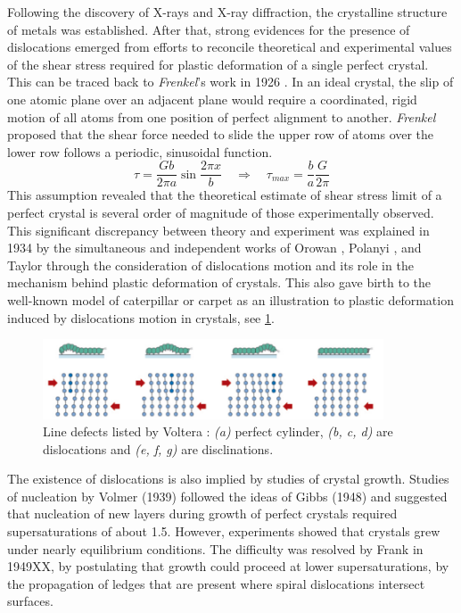 \documentclass{article}
\begin{document}
Following the discovery of X-rays and X-ray diffraction, the crystalline structure of metals was established. After that, strong evidences for the presence of dislocations emerged from efforts to reconcile theoretical and experimental values of the shear stress required for plastic deformation of a single perfect crystal. This can be traced back to \emph{Frenkel}'s work in 1926 \parencite{frenkelZurTheorie1926}. In an ideal crystal, the slip of one atomic plane over an adjacent plane would require a coordinated, rigid motion of all atoms from one position of perfect alignment to another. \emph{Frenkel} \parencite{frenkelZurTheorie1926} proposed that the shear force needed to slide the upper row of atoms over the lower row follows a periodic, sinusoidal function.
\begin{equation}
    \tau = \frac{G b}{2\pi a} \sin \frac{2\pi x}{b} \quad \Rightarrow \quad \tau_{max} = \frac{b}{a} \frac{G}{2\pi}
\end{equation}
This assumption revealed that the theoretical estimate of shear stress limit of a perfect crystal is several order of magnitude of those experimentally observed. This significant discrepancy between theory and experiment was explained in 1934 by the simultaneous and independent works of Orowan \parencite{Orowan34}, Polanyi \parencite{Polanyi34}, and Taylor \parencite{taylorMechanismPlastic1934} through the consideration of dislocations motion and its role in the mechanism behind plastic deformation of crystals. This also gave birth to the well-known model of caterpillar or carpet as an illustration to plastic deformation induced by dislocations motion in crystals, see \cref{fig:caterpilarPlasticity}.
\begin{figure}[H]
    \centering
    \includegraphics[width=0.9\textwidth]{imgs/fdm/caterpilar.png}
    \caption{Line defects listed by Voltera \parencite{voltera1907}:  \emph{(a)} perfect cylinder, \emph{(b, c, d)} are  dislocations and \emph{(e, f, g)} are disclinations.}\label{fig:caterpilarPlasticity}
\end{figure}
The existence of dislocations is also implied by studies of crystal growth. Studies of nucleation by Volmer (1939) followed the ideas of Gibbs (1948) and suggested that nucleation of new layers during growth of perfect crystals required supersaturations of about 1.5. However, experiments showed that crystals grew under nearly equilibrium conditions. The difficulty was resolved by Frank in 1949XX, by postulating that growth could proceed at lower supersaturations, by the propagation of ledges that are present where spiral dislocations intersect surfaces.\\
\end{document}
